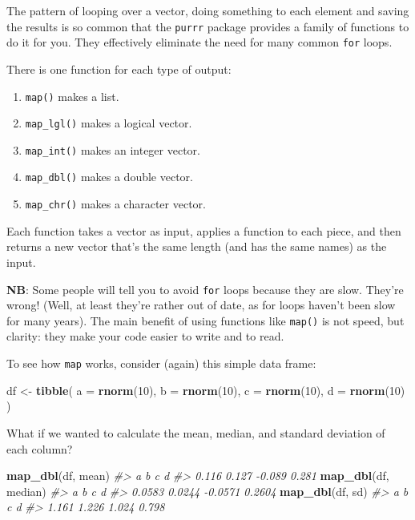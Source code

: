 \documentclass[]{book}
\newenvironment{Shaded}{\begin{snugshade}}{\end{snugshade}}
\newcommand{\CommentTok}[1]{\textcolor[rgb]{0.56,0.35,0.01}{\textit{#1}}}
\newcommand{\DataTypeTok}[1]{\textcolor[rgb]{0.13,0.29,0.53}{#1}}
\newcommand{\DecValTok}[1]{\textcolor[rgb]{0.00,0.00,0.81}{#1}}
\newcommand{\KeywordTok}[1]{\textcolor[rgb]{0.13,0.29,0.53}{\textbf{#1}}}
\newcommand{\NormalTok}[1]{#1}
\newcommand{\StringTok}[1]{\textcolor[rgb]{0.31,0.60,0.02}{#1}}
\providecommand{\tightlist}{%
  \setlength{\itemsep}{0pt}\setlength{\parskip}{0pt}}
\begin{document}
The pattern of looping over a vector, doing something to each element and saving the results is so common that the \texttt{purrr} package provides a family of functions to do it for you. They effectively eliminate the need for many common \texttt{for} loops.

There is one function for each type of output:

\begin{enumerate}
\def\labelenumi{\arabic{enumi}.}
\tightlist
\item
  \texttt{map()} makes a list.
\item
  \texttt{map\_lgl()} makes a logical vector.
\item
  \texttt{map\_int()} makes an integer vector.
\item
  \texttt{map\_dbl()} makes a double vector.
\item
  \texttt{map\_chr()} makes a character vector.
\end{enumerate}

Each function takes a vector as input, applies a function to each piece, and then returns a new vector that's the same length (and has the same names) as the input.

\textbf{NB}: Some people will tell you to avoid \texttt{for} loops because they are slow. They're wrong! (Well, at least they're rather out of date, as for loops haven't been slow for many years). The main benefit of using functions like \texttt{map()} is not speed, but clarity: they make your code easier to write and to read.

To see how \texttt{map} works, consider (again) this simple data frame:

\begin{Shaded}
\begin{Highlighting}[]
\NormalTok{df <-}\StringTok{ }\KeywordTok{tibble}\NormalTok{(}
  \DataTypeTok{a =} \KeywordTok{rnorm}\NormalTok{(}\DecValTok{10}\NormalTok{),}
  \DataTypeTok{b =} \KeywordTok{rnorm}\NormalTok{(}\DecValTok{10}\NormalTok{),}
  \DataTypeTok{c =} \KeywordTok{rnorm}\NormalTok{(}\DecValTok{10}\NormalTok{),}
  \DataTypeTok{d =} \KeywordTok{rnorm}\NormalTok{(}\DecValTok{10}\NormalTok{)}
\NormalTok{)}
\end{Highlighting}
\end{Shaded}

What if we wanted to calculate the mean, median, and standard deviation of each column?

\begin{Shaded}
\begin{Highlighting}[]
\KeywordTok{map_dbl}\NormalTok{(df, mean)}
\CommentTok{#>      a      b      c      d }
\CommentTok{#>  0.116  0.127 -0.089  0.281}
\KeywordTok{map_dbl}\NormalTok{(df, median)}
\CommentTok{#>       a       b       c       d }
\CommentTok{#>  0.0583  0.0244 -0.0571  0.2604}
\KeywordTok{map_dbl}\NormalTok{(df, sd)}
\CommentTok{#>     a     b     c     d }
\CommentTok{#> 1.161 1.226 1.024 0.798}
\end{Highlighting}
\end{Shaded}
\end{document}
